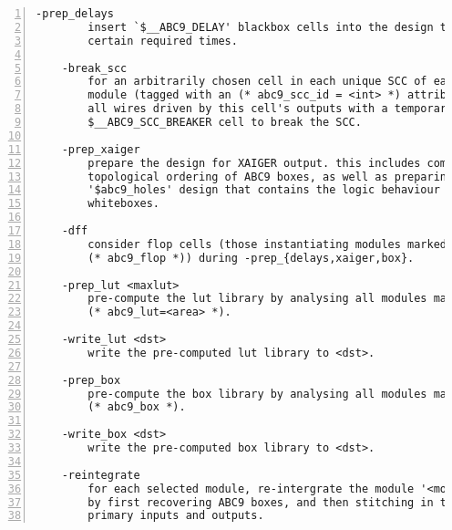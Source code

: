 \begin{lstlisting}[numbers=left,frame=single]
    -prep_delays
        insert `$__ABC9_DELAY' blackbox cells into the design to account for
        certain required times.

    -break_scc
        for an arbitrarily chosen cell in each unique SCC of each selected
        module (tagged with an (* abc9_scc_id = <int> *) attribute) interrupt
        all wires driven by this cell's outputs with a temporary
        $__ABC9_SCC_BREAKER cell to break the SCC.

    -prep_xaiger
        prepare the design for XAIGER output. this includes computing the
        topological ordering of ABC9 boxes, as well as preparing the 
        '$abc9_holes' design that contains the logic behaviour of ABC9
        whiteboxes.

    -dff
        consider flop cells (those instantiating modules marked with
        (* abc9_flop *)) during -prep_{delays,xaiger,box}.

    -prep_lut <maxlut>
        pre-compute the lut library by analysing all modules marked with
        (* abc9_lut=<area> *).

    -write_lut <dst>
        write the pre-computed lut library to <dst>.

    -prep_box
        pre-compute the box library by analysing all modules marked with
        (* abc9_box *).

    -write_box <dst>
        write the pre-computed box library to <dst>.

    -reintegrate
        for each selected module, re-intergrate the module '<module-name>$abc9'
        by first recovering ABC9 boxes, and then stitching in the remaining
        primary inputs and outputs.
\end{lstlisting}

